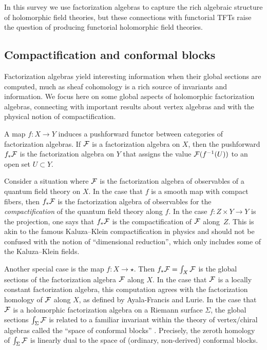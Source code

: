 \documentclass[11pt]{amsart}
\def\owen#1{{\textcolor{red!50!black}{OG: {#1}}}}
\begin{document}
In this survey we use factorization algebras to capture the rich algebraic structure of holomorphic field theories,
but these connections with functorial TFTs raise the question of producing functorial holomorphic field theories.

%
%

\subsection{Compactification and conformal blocks}
\label{s:compact}

Factorization algebras yield interesting information when their global sections are computed,
much as sheaf cohomology is a rich source of invariants and information.
We focus here on some global aspects of holomorphic factorization algebras,
connecting with important results about vertex algebras and with the physical notion of compactification.

A map $f \colon X \to Y$ induces a pushforward functor between categories of factorization algebras.
If $\mathcal F$ is a factorization algebra on $X$, 
then the pushforward $f_* \mathcal F$ is the factorization algebra on $Y$ that assigns the value $\mathcal F(f^{-1}(U))$ to an open set $U \subset Y$.

Consider a situation where $\mathcal F$ is the factorization algebra of observables of a quantum field theory on $X$.
In the case that $f$ is a smooth map with compact fibers, 
then $f_* \mathcal F$ is the factorization algebra of observables for the \textit{compactification} of the quantum field theory along $f$.
In the case $f \colon Z \times Y \to Y$ is the projection, 
one says that $f_* \mathcal F$ is the compactification of $\mathcal F$ along~$Z$.
This is akin to the famous Kaluza--Klein compactification in physics and should not be confused with the notion of ``dimensional reduction'', which only includes some of the Kaluza--Klein fields.

Another special case is the map $f: X \to \star$.
Then $f_* \mathcal F = \int_X \mathcal F$ is the global sections of the factorization algebra $\mathcal F$ along $X$.
In the case that $\mathcal F$ is a locally constant factorization algebra, 
this computation agrees with the factorization homology of $\mathcal F$ along $X$, as defined by Ayala-Francis and Lurie.
In the case that $\mathcal F$ is a holomorphic factorization algebra on a Riemann surface $\Sigma$, 
the global sections $\int_\Sigma \mathcal F$ is related to a familiar invariant within the theory of vertex/chiral algebras called the ``space of conformal blocks'' \cite[\S 8]{FBZ}.
Precisely, the zeroth homology of $\int_\Sigma \mathcal F$ is linearly dual to the space of (ordinary, non-derived) conformal blocks.
\end{document}
